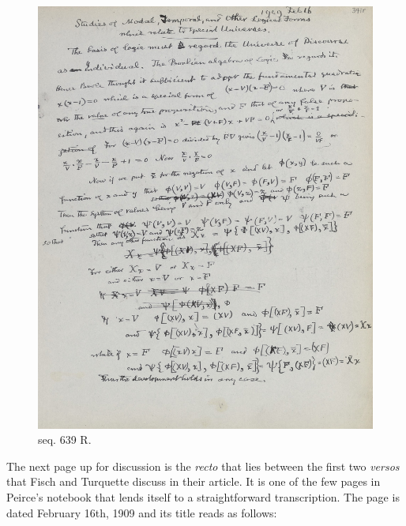 \begin{figure}
    \centering
\includegraphics[width=\textwidth]{images/seq639.jpg}
    \caption{seq. 639 R.}
    \label{fig:639r}
\end{figure}

The next page up for discussion is the \textit{recto} that lies between the first two \textit{versos} that Fisch and Turquette discuss in their article. It is one of the few pages in Peirce's notebook that lends itself to a straightforward transcription. The page is dated February 16th, 1909 and its title reads as follows:

\begin{center}
\end{center}

